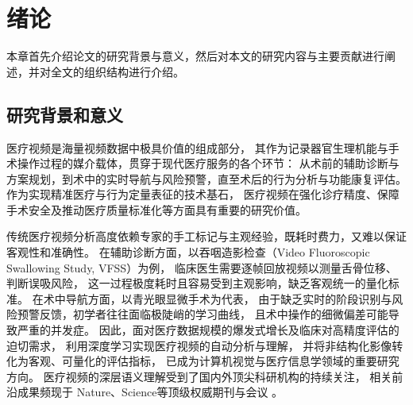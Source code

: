 \chapter{绪论}

本章首先介绍论文的研究背景与意义，然后对本文的研究内容与主要贡献进行阐
述，并对全文的组织结构进行介绍。

\section{研究背景和意义}


医疗视频是海量视频数据中极具价值的组成部分，
其作为记录器官生理机能与手术操作过程的媒介载体，贯穿于现代医疗服务的各个环节：
从术前的辅助诊断与方案规划，到术中的实时导航与风险预警，直至术后的行为分析与功能康复评估。
作为实现精准医疗与行为定量表征的技术基石，
医疗视频在强化诊疗精度、保障手术安全及推动医疗质量标准化等方面具有重要的研究价值\cite{maier2017surgical,li2024deep}。

传统医疗视频分析高度依赖专家的手工标记与主观经验，既耗时费力，又难以保证客观性和准确性。
在辅助诊断方面，以吞咽造影检查（Video Fluoroscopic Swallowing Study, VFSS）为例，
临床医生需要逐帧回放视频以测量舌骨位移、判断误吸风险，
这一过程极度耗时且容易受到主观影响，缺乏客观统一的量化标准\cite{戴萌2016吞咽造影的分析及应用进展}。
在术中导航方面，以青光眼显微手术为代表，
由于缺乏实时的阶段识别与风险预警反馈，初学者往往面临极陡峭的学习曲线，
且术中操作的细微偏差可能导致严重的并发症\cite{lin2022accurate}。
因此，面对医疗数据规模的爆发式增长及临床对高精度评估的迫切需求，
利用深度学习实现医疗视频的自动分析与理解，
并将非结构化影像转化为客观、可量化的评估指标，
已成为计算机视觉与医疗信息学领域的重要研究方向。
医疗视频的深层语义理解受到了国内外顶尖科研机构的持续关注，
相关前沿成果频现于 Nature、Science等顶级权威期刊与会议
\cite{ouyang2020video,2009quantitative,jin2017sv,sarikaya2017detection}。

